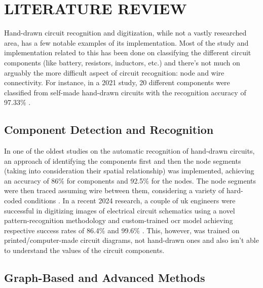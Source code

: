 \chapter{LITERATURE REVIEW}

Hand-drawn circuit recognition and digitization, while not a vastly researched area, has a few notable examples of its implementation. Most of the study and implementation related to this has been done on classifying the different circuit components (like battery, resistors, inductors, etc.) and there's not much on arguably the more difficult aspect of circuit recognition: node and wire connectivity. For instance, in a 2021 study, 20 different components were classified from self-made hand-drawn circuits with the recognition accuracy of 97.33\% \cite{adnan2021cnnbased}.

\section{Component Detection and Recognition}

In one of the oldest studies on the automatic recognition of hand-drawn circuits, an approach of identifying the components first and then the node segments (taking into consideration their spatial relationship) was implemented, achieving an accuracy of 86\% for components and 92.5\% for the nodes. The node segments were then traced assuming wire between them, considering a variety of hard-coded conditions \cite{edwards2000machine}. In a recent 2024 research, a couple of \gls{uk} engineers were successful in digitizing images of electrical circuit schematics using a novel pattern-recognition methodology and custom-trained \gls{ocr} model achieving respective success rates of 86.4\% and 99.6\% \cite{kelly2024digitizing}. This, however, was trained on printed/computer-made circuit diagrams, not hand-drawn ones and also isn't able to understand the values of the circuit components.

\section{Graph-Based and Advanced Methods}

